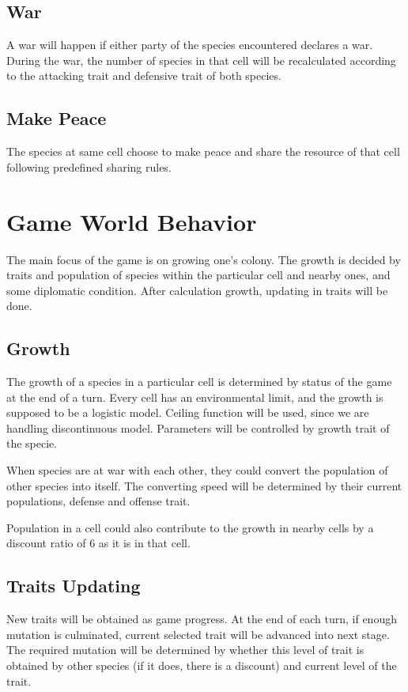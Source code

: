 \documentclass[12pt,a4paper]{article}
\begin{document}
	\subsection{War}
	A war will happen if either party of the species encountered declares a war. During the war, the number of species in that cell will be recalculated according to the attacking trait and defensive trait of both species.
	
	\subsection{Make Peace}
	The species at same cell choose to make peace and share the resource of that cell following predefined sharing rules.
\section{Game World Behavior}
The main focus of the game is on growing one's colony. The growth is decided by traits and population of species within the particular cell and nearby ones, and some diplomatic condition. After calculation growth, updating in traits will be done.

\subsection{Growth}

The growth of a species in a particular cell is determined by status of the game at the end of a turn. Every cell has an environmental limit, and the growth is supposed to be a logistic model. Ceiling function will be used, since we are handling discontinuous model. Parameters will be controlled by growth trait of the specie.

When species are at war with each other, they could convert the population of other species into itself. The converting speed will be determined by their current populations, defense and offense trait. 

Population in a cell could also contribute to the growth in nearby cells by a discount ratio of 6 as it is in that cell.
 
\subsection{Traits Updating}
New traits will be obtained as game progress. At the end of each turn, if enough mutation is culminated, current selected trait will be advanced into next stage. The required mutation will be determined by whether this level of trait is obtained by other species (if it does, there is a discount) and current level of the trait. 
\end{document}
